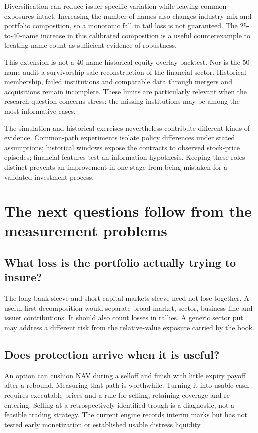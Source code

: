 \documentclass[11pt,a4paper]{article}
\begin{document}

Diversification can reduce issuer-specific variation while leaving common exposures intact. Increasing the number of names also changes industry mix and portfolio composition, so a monotonic fall in tail loss is not guaranteed. The 25-to-40-name increase in this calibrated composition is a useful counterexample to treating name count as sufficient evidence of robustness.

This extension is not a 40-name historical equity-overlay backtest. Nor is the 50-name audit a survivorship-safe reconstruction of the financial sector. Historical membership, failed institutions and comparable data through mergers and acquisitions remain incomplete. These limits are particularly relevant when the research question concerns stress: the missing institutions may be among the most informative cases.

The simulation and historical exercises nevertheless contribute different kinds of evidence. Common-path experiments isolate policy differences under stated assumptions; historical windows expose the contracts to observed stock-price episodes; financial features test an information hypothesis. Keeping these roles distinct prevents an improvement in one stage from being mistaken for a validated investment process.

\nextpage
\section*{The next questions follow from the measurement problems}
\subsection*{What loss is the portfolio actually trying to insure?}
The long bank sleeve and short capital-markets sleeve need not lose together. A useful first decomposition would separate broad-market, sector, business-line and issuer contributions. It should also count losses in rallies. A generic sector put may address a different risk from the relative-value exposure carried by the book.

\subsection*{Does protection arrive when it is useful?}
An option can cushion NAV during a selloff and finish with little expiry payoff after a rebound. Measuring that path is worthwhile. Turning it into usable cash requires executable prices and a rule for selling, retaining coverage and re-entering. Selling at a retrospectively identified trough is a diagnostic, not a feasible trading strategy. The current engine records interim marks but has not tested early monetization or established usable distress liquidity.
\end{document}
